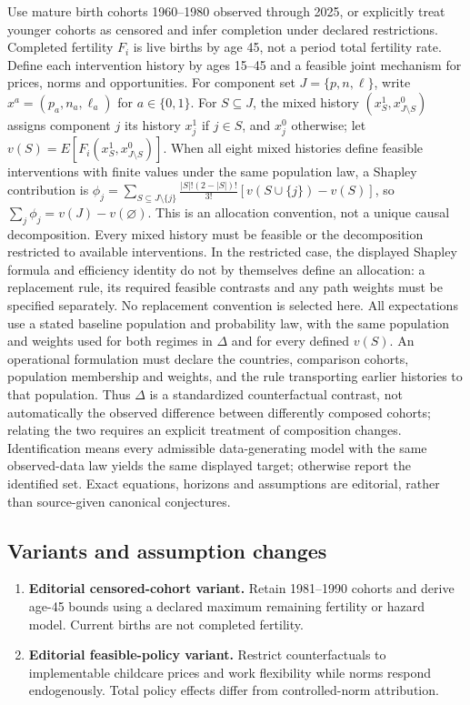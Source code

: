 \documentclass[11pt,a4paper]{article}
\begin{document}
Use mature birth cohorts 1960–1980 observed through 2025, or explicitly treat younger cohorts as censored and infer completion under declared restrictions. Completed fertility \(F_i\) is live births by age 45, not a period total fertility rate. Define each intervention history by ages 15–45 and a feasible joint mechanism for prices, norms and opportunities. For component set \(J=\{p,n,\ell\}\), write \(x^a=(p_a,n_a,\ell_a)\) for \(a\in\{0,1\}\). For \(S\subseteq J\), the mixed history \((x_S^1,x_{J\setminus S}^0)\) assigns component \(j\) its history \(x_j^1\) if \(j\in S\), and \(x_j^0\) otherwise; let \(v(S)=E[F_i(x_S^1,x_{J\setminus S}^0)]\). When all eight mixed histories define feasible interventions with finite values under the same population law, a Shapley contribution is \(\phi_j=\sum_{S\subseteq J\setminus\{j\}}\frac{|S|!(2-|S|)!}{3!}[v(S\cup\{j\})-v(S)]\), so \(\sum_j\phi_j=v(J)-v(\varnothing)\). This is an allocation convention, not a unique causal decomposition. Every mixed history must be feasible or the decomposition restricted to available interventions. In the restricted case, the displayed Shapley formula and efficiency identity do not by themselves define an allocation: a replacement rule, its required feasible contrasts and any path weights must be specified separately. No replacement convention is selected here. All expectations use a stated baseline population and probability law, with the same population and weights used for both regimes in \(\Delta\) and for every defined \(v(S)\). An operational formulation must declare the countries, comparison cohorts, population membership and weights, and the rule transporting earlier histories to that population. Thus \(\Delta\) is a standardized counterfactual contrast, not automatically the observed difference between differently composed cohorts; relating the two requires an explicit treatment of composition changes. Identification means every admissible data-generating model with the same observed-data law yields the same displayed target; otherwise report the identified set. Exact equations, horizons and assumptions are editorial, rather than source-given canonical conjectures.
\subsection*{Variants and assumption changes}
\begin{enumerate}
\item \textbf{Editorial censored-cohort variant.} Retain 1981–1990 cohorts and derive age-45 bounds using a declared maximum remaining fertility or hazard model. Current births are not completed fertility.
\item \textbf{Editorial feasible-policy variant.} Restrict counterfactuals to implementable childcare prices and work flexibility while norms respond endogenously. Total policy effects differ from controlled-norm attribution.
\end{enumerate}
\end{document}

